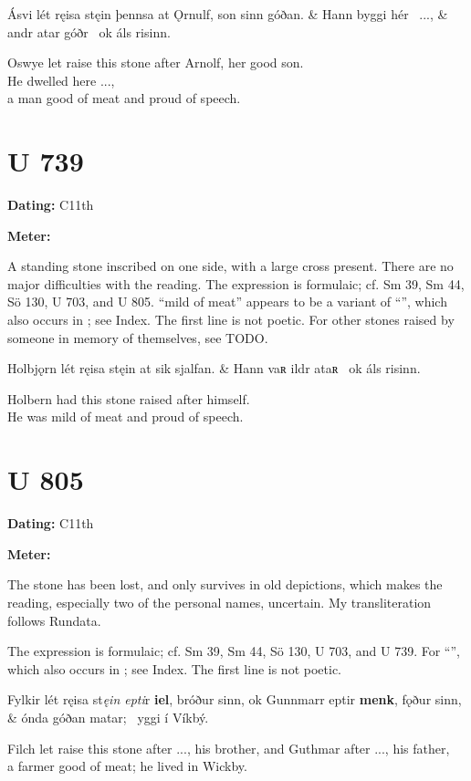 \bvg\bva[]%
Ásvi lét ręisa stęin þennsa at Ǫrnulf, son sinn góðan. &
Hann byggi hér \hld\ ..., &
andr atar góðr \hld\ ok áls risinn.\eva

\bvb Oswye let raise this stone after Arnolf, her good son. \\
He dwelled here ..., \\
a man good of meat and proud of speech.\evb\evg

\sectionline

\section{U 739}

\begin{flushright}%
\textbf{Dating:} C11th

\textbf{Meter:} \Fornyrdislag
\end{flushright}%

A standing stone inscribed on one side, with a large cross present.  There are no major difficulties with the reading.  The expression is formulaic; cf. Sm 39, Sm 44, Sö 130, U 703, and U 805.  “mild of meat” appears to be a variant of “”, which also occurs in \Havamal; see Index.  The first line is not poetic.  For other stones raised by someone in memory of themselves, see TODO.

\bvg\bva[]%
Holbjǫrn lét ręisa stęin at sik sjalfan. &
Hann vaʀ ildr ataʀ \hld\ ok áls risinn.\eva

\bvb Holbern had this stone raised after himself. \\
He was mild of meat and proud of speech.\evb\evg

\sectionline

\section{U 805}

\begin{flushright}%
\textbf{Dating:} C11th

\textbf{Meter:} \Fornyrdislag
\end{flushright}%

The stone has been lost, and only survives in old depictions, which makes the reading, especially two of the personal names, uncertain.  My transliteration follows Rundata.

The expression is formulaic; cf. Sm 39, Sm 44, Sö 130, U 703, and U 739.  For “”, which also occurs in \Havamal; see Index.  The first line is not poetic.

\bvg\bva[]%
Fylkir lét ręisa st\emph{ęin epti}r \textbf{iel}, bróður sinn, ok Gunnmarr eptir \textbf{menk}, fǫður sinn, &
ónda góðan matar; \hld\ yggi í Víkbý.\eva

\bvb Filch let raise this stone after ..., his brother, and Guthmar after ..., his father, \\
a farmer good of meat; he lived in Wickby.\evb\evg

\sectionline
